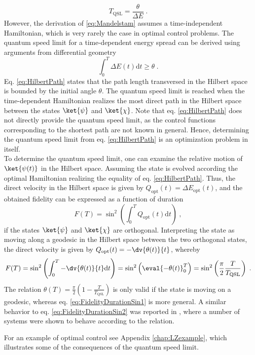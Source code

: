 \begin{equation}
	T_{\mathrm{QSL}} = \frac{\theta}{\Delta E} \; . \label{eq:Mandelstam}
\end{equation}
However, the derivation of \eqref{eq:Mandelstam} assumes a time-independent Hamiltonian, which is very rarely the case in optimal control problems. The quantum speed limit for a time-dependent energy spread can be derived using arguments from differential geometry \cite{Aharonov,beyondQSL}
\begin{equation}
	\int_{0}^{T} \Delta E(t) \mathrm{d}t \geq \theta \; . \label{eq:HilbertPath}
\end{equation}
Eq. \eqref{eq:HilbertPath} states that the path length transversed in the Hilbert space is bounded by the initial angle $\theta$. The quantum speed limit is reached when the time-dependent Hamiltonian realizes the most direct path in the Hilbert space between the states $\ket{\psi}$ and $\ket{\chi}$. Note that eq. \eqref{eq:HilbertPath} does not directly provide the quantum speed limit, as the control functions corresponding to the shortest path are not known in general. Hence, determining the quantum speed limit from eq. \eqref{eq:HilbertPath} is an optimization problem in itself.\\

To determine the quantum speed limit, one can examine the relative motion of $\ket{\psi (t)}$ in the Hilbert space. Assuming the state is evolved according the optimal Hamiltonian realizing the equality of eq. \eqref{eq:HilbertPath}. Thus, the direct velocity in the Hilbert space is given by $Q_{\mathrm{opt}} (t) = \Delta E_{\mathrm{opt}}(t)$, and the obtained fidelity can be expressed as a function of duration \cite{beyondQSL}
\begin{equation}
	F(T) = \sin ^2 \left( \int_{0}^{T} Q_{\mathrm{opt}} (t) \mathrm{d} t \right) \; ,
	\label{eq:FidelityDurationSin1}
\end{equation}  
if the states $\ket{\psi}$ and $\ket{\chi}$ are orthogonal. Interpreting the state as moving along a geodesic in the Hilbert space between the two orthogonal states, the direct velocity is given by $Q_{\mathrm{opt}} (t) =  -\dv{\theta (t)}{t}$, whereby
\begin{equation}
	F(T) = \sin ^2 \left( \int_{0}^{T} - \dv{\theta (t)}{t} \mathrm{d} t \right) =  \sin ^2 \left( \eval{ - \theta(t)}_{0}^{T} \right) = \sin ^2 \left( \frac{\pi}{2} \frac{T}{T_{\mathrm{QSL}}} \right) \; .
	\label{eq:FidelityDurationSin2}
\end{equation}  
The relation $\theta (T) = \frac{\pi}{2} \left( 1 -  \frac{T}{T_{\mathrm{QSL}}} \right)$ is only valid if the state is moving on a geodesic, whereas eq. \eqref{eq:FidelityDurationSin1} is more general. A similar behavior to eq. \eqref{eq:FidelityDurationSin2} was reported in \cite{Caneva2011}, where a number of systems were shown to behave according to the relation.

For an example of optimal control see Appendix \ref{chap:LZexample}, which illustrates some of the consequences of the quantum speed limit.